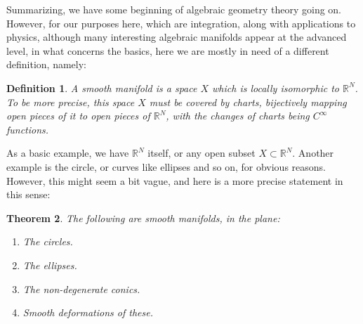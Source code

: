 \documentclass[12pt]{amsbook}
\newtheorem{theorem}{Theorem}[chapter]
\newtheorem{definition}[theorem]{Definition}
\begin{document}
Summarizing, we have some beginning of algebraic geometry theory going on. However, for our purposes here, which are integration, along with applications to physics, although many interesting algebraic manifolds appear at the advanced level, in what concerns the basics, here we are mostly in need of a different definition, namely:


\begin{definition}
A smooth manifold is a space $X$ which is locally isomorphic to $\mathbb R^N$. To be more precise, this space $X$ must be covered by charts, bijectively mapping open pieces of it to open pieces of $\mathbb R^N$, with the changes of charts being $C^\infty$ functions.
\end{definition}

As a basic example, we have $\mathbb R^N$ itself, or any open subset $X\subset\mathbb R^N$. Another example is the circle, or curves like ellipses and so on, for obvious reasons. However, this might seem a bit vague, and here is a more precise statement in this sense:

\begin{theorem}
The following are smooth manifolds, in the plane:
\begin{enumerate}
\item The circles.

\item The ellipses.

\item The non-degenerate conics.

\item Smooth deformations of these.
\end{enumerate}
\end{theorem}
\end{document}
